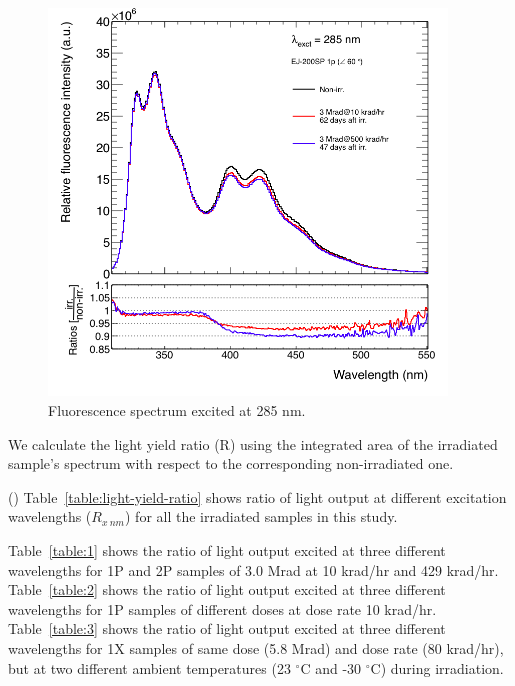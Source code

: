 \documentclass[preprint,12pt]{elsarticle}
\begin{document}
\begin{figure}[!htb]
	\centering
	\includegraphics[width=300pt]{./figures/EJ200SP-1P-exc285.png}
	\caption{Fluorescence spectrum excited at 285 nm.}
	\label{fig:EJ200SP-1P-exc285}
\end{figure}

We calculate the light yield ratio (R) using the integrated area of the irradiated sample's spectrum 
with respect to the corresponding non-irradiated one. 

({\color{red}{Should I present all the data in one table?}}) 
Table~\ref{table:light-yield-ratio} shows ratio of light output at different excitation wavelengths ($R_{x~nm}$) 
for all the irradiated samples in this study.

Table~\ref{table:1} shows the ratio of light output excited at three different wavelengths for 
1P {\color{red}{(1P1X?)}} and 2P samples of 3.0 Mrad at 10 krad/hr and 429 krad/hr. 
Table~\ref{table:2} shows the ratio of light output excited at three different wavelengths for 
1P {\color{red}{(1P1X?)}} samples of different doses at dose rate 10 krad/hr. 
Table~\ref{table:3} shows the ratio of light output excited at three different wavelengths for 
1X {\color{red}{(1P1X?)}} samples of same dose (5.8 Mrad) and dose rate (80 krad/hr), 
but at two different ambient temperatures (23 $^\circ$C and -30 $^\circ$C) during irradiation. 
\end{document}
